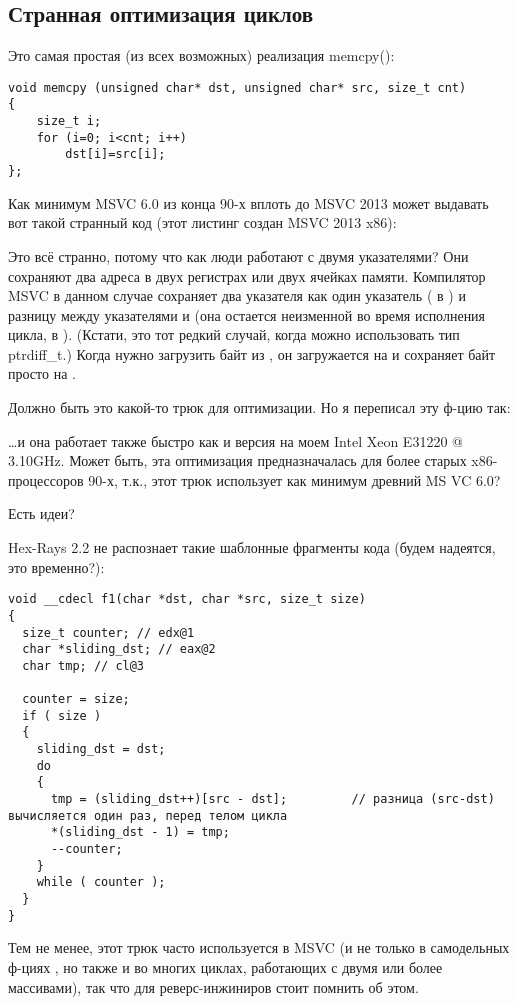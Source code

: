 \subsection{Странная оптимизация циклов}

Это самая простая (из всех возможных) реализация memcpy():

\begin{lstlisting}[style=customc]
void memcpy (unsigned char* dst, unsigned char* src, size_t cnt)
{
	size_t i;
	for (i=0; i<cnt; i++)
		dst[i]=src[i];
};
\end{lstlisting}

Как минимум MSVC 6.0 из конца 90-х вплоть до MSVC 2013 может выдавать вот такой странный код (этот листинг создан MSVC 2013
x86):



Это всё странно, потому что как люди работают с двумя указателями? Они сохраняют два адреса в двух регистрах или двух
ячейках памяти.
Компилятор MSVC в данном случае сохраняет два указателя как один указатель ( в \EAX)
и разницу между указателями  и  (она остается неизменной во время исполнения цикла, в \ESI).
(Кстати, это тот редкий случай, когда можно использовать тип ptrdiff\_t.)
Когда нужно загрузить байт из , он загружается на  и сохраняет байт просто на
.

Должно быть это какой-то трюк для оптимизации. Но я переписал эту ф-цию так:



\dots и она работает также быстро как и  версия на моем Intel Xeon E31220 @ 3.10GHz.
Может быть, эта оптимизация предназначалась для более старых x86-процессоров 90-х, т.к., этот трюк использует
как минимум древний MS VC 6.0?

Есть идеи?

Hex-Rays 2.2 не распознает такие шаблонные фрагменты кода (будем надеятся, это временно?):

\begin{lstlisting}[style=customc]
void __cdecl f1(char *dst, char *src, size_t size)
{
  size_t counter; // edx@1
  char *sliding_dst; // eax@2
  char tmp; // cl@3

  counter = size;
  if ( size )
  {
    sliding_dst = dst;
    do
    {
      tmp = (sliding_dst++)[src - dst];         // разница (src-dst) вычисляется один раз, перед телом цикла
      *(sliding_dst - 1) = tmp;
      --counter;
    }
    while ( counter );
  }
}
\end{lstlisting}

Тем не менее, этот трюк часто используется в MSVC (и не только в самодельных ф-циях , но также и во многих
циклах, работающих с двумя или более массивами), так что для реверс-инжиниров стоит помнить об этом.


